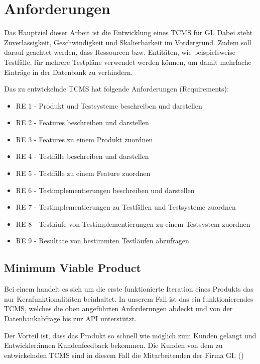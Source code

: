 \documentclass[a4paper, fontsize=11pt, parskip=half, twoside]{scrreprt}
\begin{document}
	
	
	\chapter{Anforderungen} \label{chapter:requiremnts}
	Das Hauptziel dieser Arbeit ist die Entwicklung eines \ac{TCMS} für \ac{GI}.
	Dabei steht Zuverlässigkeit, Geschwindigkeit und Skalierbarkeit im Vordergrund.
	Zudem soll darauf geachtet werden, dass Ressourcen bzw. Entitäten, wie beispielsweise Testfälle, für mehrere Testpläne verwendet werden können, um damit mehrfache Einträge in der Datenbank zu verhindern.
	
	Das zu entwickelnde \ac{TCMS} hat folgende Anforderungen (Requirements):
	
	\begin{itemize}
		\setlength\itemsep{-0.5em}
		\item RE 1 - Produkt und Testsysteme beschreiben und darstellen
		\item RE 2 - Features beschreiben und darstellen
		\item RE 3 - Features zu einem Produkt zuordnen
		\item RE 4 - Testfälle beschreiben und darstellen
		\item RE 5 - Testfälle zu einem Feature zuordnen
		\item RE 6 - Testimplementierungen beschreiben und darstellen
		\item RE 7 - Testimplementierungen zu Testfällen und Testsysteme zuordnen
		\item RE 8 - Testläufe von Testimplementierungen zu einem Testsystem zuordnen
		\item RE 9 - Resultate von bestimmten Testläufen abzufragen
	\end{itemize}
	
	
	\section{Minimum Viable Product}
	Bei einem  handelt es sich um die erste funktionierte Iteration eines Produkts das nur Kernfunktionalitäten beinhaltet.
	In unserem Fall ist das ein funktionierendes \ac{TCMS}, welches die oben angeführten Anforderungen abdeckt und von der Datenbankabfrage bis zur \ac{API} unterstützt.
	
	Der Vorteil ist, dass das Produkt so schnell wie möglich zum Kunden gelangt und Entwickler:innen Kundenfeedback bekommen.
	Die Kunden von dem zu entwickelnden \ac{TCMS} sind in diesem Fall die Mitarbeitenden der Firma \acl{GI}. (\textcite{alliance_what_2017})
	
\end{document}
